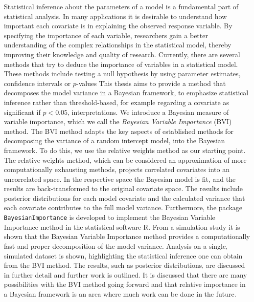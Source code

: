 Statistical inference about the parameters of a model is a fundamental part of statistical analysis. 
In many applications it is desirable to understand how important each covariate is in explaining the observed response variable.
By specifying the importance of each variable, researchers gain a better understanding of the complex relationships in the statistical model, thereby improving their knowledge and quality of research.
Currently, there are several methods that try to deduce the importance of variables in a statistical model.
These methods include testing a null hypothesis by using parameter estimates, confidence intervals or $p$-values
This thesis aims to provide a method that decomposes the model variance in a Bayesian framework, to emphasize statistical inference rather than threshold-based, for example regarding a covariate as significant if $p<0.05$, interpretations.
\newline
\newline 
We introduce a Bayesian measure of variable importance, which we call the \textit{Bayesian Variable Importance} (BVI) method. 
The BVI method adapts the key aspects of established methods for decomposing the variance of a random intercept model, into the Bayesian framework.
To do this, we use the relative weights method as our starting point.
The relative weights method, which can be considered an approximation of more computationally exhausting methods, projects correlated covariates into an uncorrelated space.
In the respective space the Bayesian model is fit, and the results are back-transformed to the original covariate space. 
The results include posterior distributions for each model covariate and the calculated variance that each covariate contributes to the full model variance. 
Furthermore, the package \texttt{BayesianImportance} is developed to implement the Bayesian Variable Importance method in the statistical software R.
\newline 
\newline 
From a simulation study it is shown that the Bayesian Variable Importance method provides a computationally fast and proper decomposition of the model variance.
Analysis on a single, simulated dataset is shown, highlighting the statistical inference one can obtain from the BVI method.
The results, such as posterior distributions, are discussed in further detail and further work is outlined.
It is discussed that there are many possibilities with the BVI method going forward and that relative importance in a Bayesian framework is an area where much work can be done in the future. 


